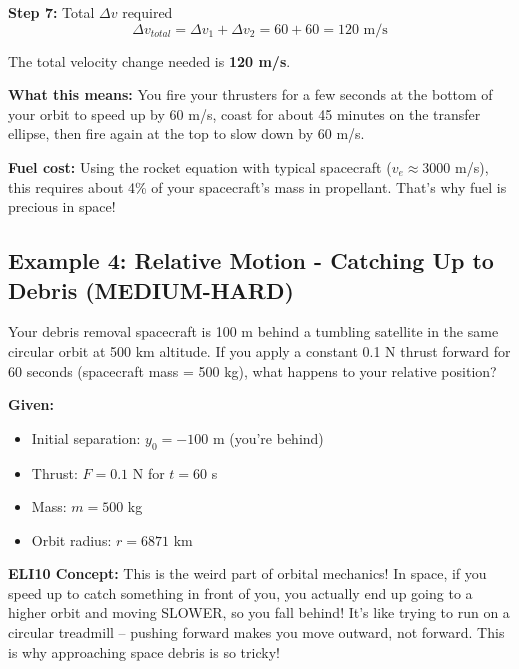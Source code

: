\documentclass[11pt,a4paper]{article}
\begin{document}
\textbf{Step 7:} Total $\Delta v$ required
\begin{equation}
\Delta v_{total} = \Delta v_1 + \Delta v_2 = 60 + 60 = 120 \text{ m/s}
\end{equation}

\begin{tcolorbox}[colback=blue!5!white,colframe=blue!60!black,title=Answer]
The total velocity change needed is \textbf{120 m/s}.

\textbf{What this means:} You fire your thrusters for a few seconds at the bottom of your orbit to speed up by 60 m/s, coast for about 45 minutes on the transfer ellipse, then fire again at the top to slow down by 60 m/s.

\textbf{Fuel cost:} Using the rocket equation with typical spacecraft ($v_e \approx 3000$ m/s), this requires about 4\% of your spacecraft's mass in propellant. That's why fuel is precious in space!
\end{tcolorbox}

\subsection{Example 4: Relative Motion - Catching Up to Debris (MEDIUM-HARD)}

\begin{tcolorbox}[colback=green!5!white,colframe=green!60!black,title=Problem]
Your debris removal spacecraft is 100 m behind a tumbling satellite in the same circular orbit at 500 km altitude. If you apply a constant 0.1 N thrust forward for 60 seconds (spacecraft mass = 500 kg), what happens to your relative position?

\textbf{Given:}
\begin{itemize}[nosep]
    \item Initial separation: $y_0 = -100$ m (you're behind)
    \item Thrust: $F = 0.1$ N for $t = 60$ s
    \item Mass: $m = 500$ kg
    \item Orbit radius: $r = 6871$ km
\end{itemize}
\end{tcolorbox}

\textbf{ELI10 Concept:} This is the weird part of orbital mechanics! In space, if you speed up to catch something in front of you, you actually end up going to a higher orbit and moving SLOWER, so you fall behind! It's like trying to run on a circular treadmill -- pushing forward makes you move outward, not forward. This is why approaching space debris is so tricky!
\end{document}
